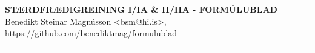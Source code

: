 \documentclass[11pt,icelandic]{article}
\begin{document}

\begin{center}
	{\Large\bf STÆRÐFRÆÐIGREINING I/IA \& II/IIA - FORMÚLUBLAÐ}\\
    Benedikt Steinar Magnússon <bsm@hi.is>, \url{https://github.com/benediktmag/formulublad}
\end{center}

\hrule



\newpage


\end{document}
